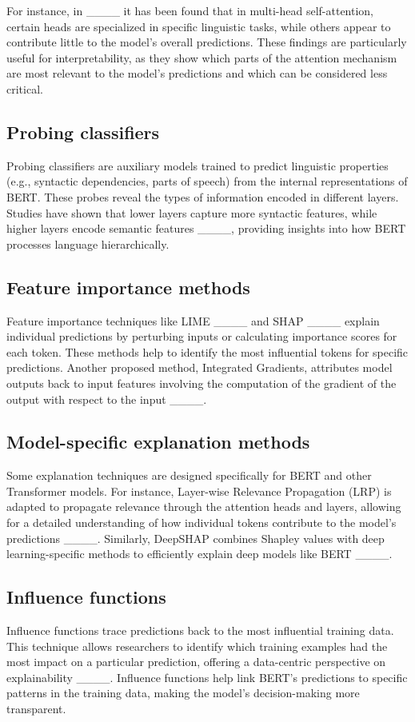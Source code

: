 For instance, in ____ it has been found that in multi-head self-attention, certain heads are specialized in specific linguistic tasks, while others appear to contribute little to the model’s overall predictions. These findings are particularly useful for interpretability, as they show which parts of the attention mechanism are most relevant to the model’s predictions and which can be considered less critical.

\subsection{Probing classifiers}
Probing classifiers are auxiliary models trained to predict linguistic properties (e.g., syntactic dependencies, parts of speech) from the internal representations of BERT. These probes reveal the types of information encoded in different layers. Studies have shown that lower layers capture more syntactic features, while higher layers encode semantic features ____, providing insights into how BERT processes language hierarchically.

\subsection{Feature importance methods}
Feature importance techniques like LIME ____ and SHAP ____ explain individual predictions by perturbing inputs or calculating importance scores for each token. These methods help to identify the most influential tokens for specific predictions. Another proposed method, Integrated Gradients, attributes model outputs back to input features involving the computation of the gradient of the output with respect to the input ____.

\subsection{Model-specific explanation methods}
Some explanation techniques are designed specifically for BERT and other Transformer models. For instance, Layer-wise Relevance Propagation (LRP) is adapted to propagate relevance through the attention heads and layers, allowing for a detailed understanding of how individual tokens contribute to the model's predictions ____. Similarly, DeepSHAP combines Shapley values with deep learning-specific methods to efficiently explain deep models like BERT ____.

\subsection{Influence functions}
Influence functions trace predictions back to the most influential training data. This technique allows researchers to identify which training examples had the most impact on a particular prediction, offering a data-centric perspective on explainability ____. Influence functions help link BERT’s predictions to specific patterns in the training data, making the model's decision-making more transparent.

